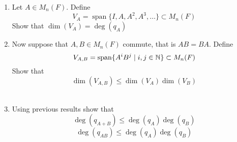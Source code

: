 \documentclass[12pt]{amsart}
\DeclareMathOperator{\spn}{span}
\begin{document}
	
	\begin{enumerate}
		\item Let $A \in M_n(F)$. Define $$V_A = \spn\{I, A, A^2, A^3, \ldots \} \subset M_n(F)$$ 
		Show that $\dim(V_A) = \deg(q_A)$ \\
		\item Now suppose that $A,B  \in M_n(F)$ commute, that is  $AB = BA$. Define 
		$$V_{A,B} = \spn\{A^i B^j \mid i,j \in \N\} \subset M_n(F)$$
		Show that $$\dim(V_{A,B}) \leq \dim(V_A) \dim(V_B)$$\\
		\item Using previous results show that
	$$ \deg(q_{A+B}) \leq \deg(q_A) \deg(q_B) $$
	$$ \deg(q_{AB}) \leq \deg(q_A) \deg(q_B) $$
	\end{enumerate}
\end{document}
